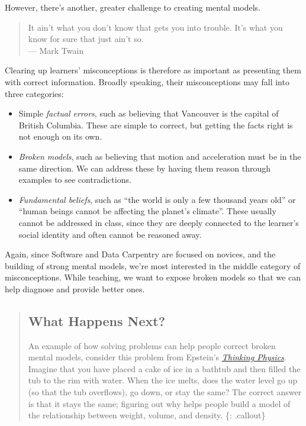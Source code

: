 However, there's another, greater challenge to creating mental models.

\begin{quote}
It ain't what you don't know that gets you into trouble. It's what you
know for sure that just ain't so.\\--- Mark Twain
\end{quote}

Clearing up learners' misconceptions is therefore as important as
presenting them with correct information. Broadly speaking, their
misconceptions may fall into three categories:

\begin{itemize}
\itemsep1pt\parskip0pt
\item
  Simple \emph{factual errors}, such as believing that Vancouver is the
  capital of British Columbia. These are simple to correct, but getting
  the facts right is not enough on its own.
\item
  \emph{Broken models}, such as believing that motion and acceleration
  must be in the same direction. We can address these by having them
  reason through examples to see contradictions.
\item
  \emph{Fundamental beliefs}, such as ``the world is only a few thousand
  years old'' or ``human beings cannot be affecting the planet's
  climate''. These usually cannot be addressed in class, since they are
  deeply connected to the learner's social identity and often cannot be
  reasoned away.
\end{itemize}

Again, since Software and Data Carpentry are focused on novices, and the
building of strong mental models, we're most interested in the middle
category of misconceptions. While teaching, we want to expose broken
models so that we can help diagnose and provide better ones.

\begin{quote}
\subsection{What Happens Next?}\label{what-happens-next}

An example of how solving problems can help people correct broken mental
models, consider this problem from Epstein's
\emph{\href{http://www.amazon.com/Thinking-Physics-Understandable-Practical-Reality/dp/0935218084/r}{Thinking
Physics}}. Imagine that you have placed a cake of ice in a bathtub and
then filled the tub to the rim with water. When the ice melts, does the
water level go up (so that the tub overflows), go down, or stay the
same? The correct answer is that it stays the same; figuring out why
helps people build a model of the relationship between weight, volume,
and density. \{: .callout\}
\end{quote}

